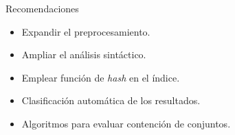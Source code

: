 \documentclass{beamer}
\begin{document}
\begin{frame}{Recomendaciones}
\begin{itemize}
  \item Expandir el preprocesamiento.
  \item Ampliar el análisis sintáctico.
  \item Emplear función de \textit{hash} en el índice.
  \item Clasificación automática de los resultados.
  \item Algoritmos para evaluar contención de conjuntos.
\end{itemize}
\end{frame}
\end{document}
